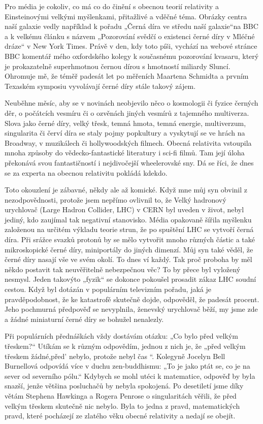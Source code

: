   Pro média je cokoliv, co má co do činění s obecnou teorií relativity a Einsteinovými velkými
  myšlenkami, přitažlivé a vděčné téma. Obrázky centra naší galaxie vedly například k pořadu „Černá
  díra ve středu naší galaxie“na BBC a k velkému článku s názvem „Pozorování svědčí o existenci
  černé díry v Mléčné dráze“ v New York Times. Právě v den, kdy toto píši, vychází na webové stránce
  BBC komentář mého oxfordského kolegy k současnému pozorování kvasaru, který je prokazatelně
  superhmotnou černou dírou s hmotností miliardy Sluncí. Ohromuje mě, že téměř padesát let po
  měřeních Maartena Schmidta a prvním Texaském symposiu vyvolávají černé díry stále takový zájem.
  
  Neuběhne měsíc, aby se v novinách neobjevilo něco o kosmologii či fyzice černých děr, o počátcích
  vesmíru či o ozvěnách jiných vesmírů z tajemného multiverza. Slova jako černé díry, velký třesk,
  temná hmota, temná energie, multiverzum, singularita či červí díra se staly pojmy popkultury a
  vyskytují se ve hrách na Broadway, v muzikálech či hollywoodských filmech. Obecná relativita
  vstoupila mnoha způsoby do vědecko-fantastické literatury i sci-fi filmů. Tam její úloha překonává
  svou fantastičností i nejdivočejší wheelerovské sny. Dá se říci, že dnes se za experta na obecnou
  relativitu pokládá kdekdo. 
  
  Toto okouzlení je zábavné, někdy ale až komické. Když mne můj syn obvinil z nezodpovědnosti,
  protože jsem nepřímo ovlivnil to, že Velký hadronový urychlovač (Large Hadron Collider, LHC) v
  CERN byl uveden v život, nebyl jediný, kdo zaujímal tak negativní stanovisko. Média opakovaně
  šířila myšlenku založenou na určitém výkladu teorie strun, že po spuštění LHC se vytvoří černá
  díra. Při srážce svazků protonů by se mělo vytvořit mnoho různých částic a také mikroskopické
  černé díry, miniportály do jiných dimenzí. Můj syn také věděl, že černé díry nasají vše ve svém
  okolí. To dnes ví každý. Tak proč proboha by měl někdo postavit tak neuvěřitelně nebezpečnou věc?
  To by přece byl vyložený nesmysl. Jeden takovýto „fyzik“ se dokonce pokoušel prosadit zákaz LHC
  soudní cestou. Když byl dotázán v populárním televizním pořadu, jaká je pravděpodobnost, že ke
  katastrofě skutečně dojde, odpověděl, že padesát procent. Jeho pochmurná předpověď se nevyplnila,
  ženevský urychlovač běží, my jsme zde a žádné miniaturní černé díry se bohužel nenalezly. 
  
  Při populárních přednáškách vždy dostávám otázku: „Co bylo před velkým třeskem?“ Utíkám se k
  různým odpovědím, jednou z nich je, že „před velkým třeskem žádné,před' nebylo, protože nebyl čas
  “. Kolegyně Jocelyn Bell Burnellová odpovídá více v duchu zen-buddhismu: „To je jako ptát se, co
  je na sever od severního pólu.“ Kdybych se mohl utéci k matematice, odpověď by byla snazší, jenže
  většina posluchačů by nebyla spokojená. Po desetiletí jsme díky větám Stephena Hawkinga a Rogera
  Penrose o singularitách věřili, že před velkým třeskem skutečně nic nebylo. Byla to jedna z pravd,
  matematických pravd, které pocházejí ze zlatého věku obecné relativity a nedají se obejít. 
  

